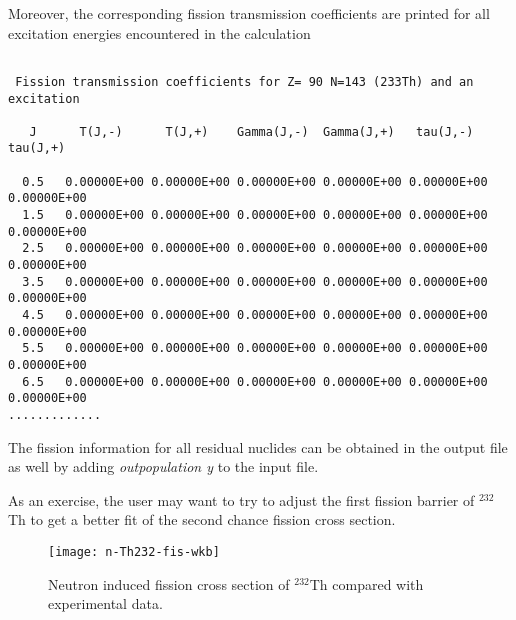 \begin{samplecase}
Moreover, the corresponding fission transmission coefficients are printed for
all excitation energies encountered in the calculation
{\small \begin{verbatim}

 Fission transmission coefficients for Z= 90 N=143 (233Th) and an excitation 

   J      T(J,-)      T(J,+)    Gamma(J,-)  Gamma(J,+)   tau(J,-)    tau(J,+)

  0.5   0.00000E+00 0.00000E+00 0.00000E+00 0.00000E+00 0.00000E+00 0.00000E+00
  1.5   0.00000E+00 0.00000E+00 0.00000E+00 0.00000E+00 0.00000E+00 0.00000E+00
  2.5   0.00000E+00 0.00000E+00 0.00000E+00 0.00000E+00 0.00000E+00 0.00000E+00
  3.5   0.00000E+00 0.00000E+00 0.00000E+00 0.00000E+00 0.00000E+00 0.00000E+00
  4.5   0.00000E+00 0.00000E+00 0.00000E+00 0.00000E+00 0.00000E+00 0.00000E+00
  5.5   0.00000E+00 0.00000E+00 0.00000E+00 0.00000E+00 0.00000E+00 0.00000E+00
  6.5   0.00000E+00 0.00000E+00 0.00000E+00 0.00000E+00 0.00000E+00 0.00000E+00
.............
\end{verbatim} } \renewcommand{\baselinestretch}{1.07}\small\normalsize
The fission information for all residual nuclides can be obtained in the
output file as well by adding {\em outpopulation y} to the input file.

As an exercise, the user may want to try to adjust the first fission barrier
of $^{232}$Th to get a better fit of the second chance fission cross section.

\end{samplecase}
\begin{figure}
\centering\texttt{[image: n-Th232-fis-wkb]}
\caption{Neutron induced fission cross section of ${}^{232}$Th compared with
experimental data.}
\label{fissioneps}
\end{figure}
